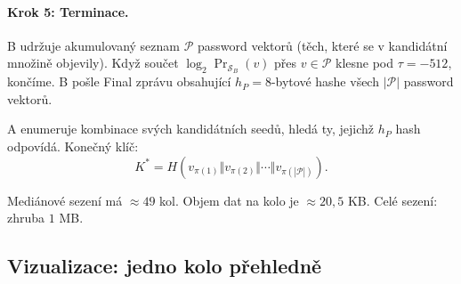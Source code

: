 \documentclass[11pt,a4paper]{article}
\begin{document}
\paragraph{Krok 5: Terminace.}
B udržuje akumulovaný seznam $\mathcal{P}$ password vektorů (těch, které se v kandidátní množině objevily). Když součet $\log_2 \Pr_{\mathcal{S}_B}(v)$ přes $v \in \mathcal{P}$ klesne pod $\tau = -512$, končíme. B pošle Final zprávu obsahující $h_P = 8$-bytové hashe všech $|\mathcal{P}|$ password vektorů.

A enumeruje kombinace svých kandidátních seedů, hledá ty, jejichž $h_P$ hash odpovídá. Konečný klíč:
\[
K^* = H(v_{\pi(1)} \Vert v_{\pi(2)} \Vert \cdots \Vert v_{\pi(|\mathcal{P}|)}).
\]

Mediánové sezení má $\approx 49$ kol. Objem dat na kolo je $\approx 20{,}5$ KB. Celé sezení: zhruba $1$ MB.

\subsection{Vizualizace: jedno kolo přehledně}
\end{document}
